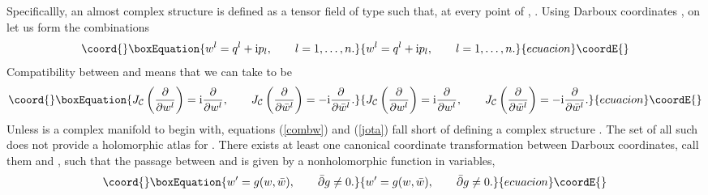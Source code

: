\documentclass[a4paper,a4paper]{article}
\begin{document}
Specificallly, an almost complex structure is defined  
as a tensor field \coordHE{} of type \coordHE{} such that, at every point of 
\coordHE{}, \coordHE{} \cite{KN}.  Using Darboux coordinates \coordHE{}, 
\coordHE{} on \coordHE{} let us form the combinations
\begin{equation}\coord{}\boxEquation{
w^l=q^l + {\rm i} p_l, \qquad l=1,\ldots, n.
\label{combw}
}{
w^l=q^l + {\rm i} p_l, \qquad l=1,\ldots, n.
}{ecuacion}\coordE{}\end{equation} 
Compatibility between \coordHE{} and \coordHE{} means that we can take \coordHE{} 
to be 
\begin{equation}\coord{}\boxEquation{
J_{\cal C}\left({\partial\over\partial w^l}\right)={\rm i}{\partial\over\partial w^l},
\qquad 
J_{\cal C}\left({\partial\over\partial \bar w^l}\right)=-{\rm i}{\partial\over\partial\bar w^l}.
\label{jota}
}{
J_{\cal C}\left({\partial\over\partial w^l}\right)={\rm i}{\partial\over\partial w^l},
\qquad 
J_{\cal C}\left({\partial\over\partial \bar w^l}\right)=-{\rm i}{\partial\over\partial\bar w^l}.
}{ecuacion}\coordE{}\end{equation}
Unless \coordHE{} is a complex  manifold to begin with, equations 
(\ref{combw}) and (\ref{jota}) fall short of defining a complex structure \coordHE{}. 
The set of all such \coordHE{} does not provide a holomorphic atlas for \coordHE{}. 
There exists at least one canonical coordinate transformation between 
Darboux coordinates, call them \coordHE{} and \coordHE{}, such that 
the passage between \coordHE{} and \coordHE{}
is given by a nonholomorphic function \coordHE{} in \coordHE{} variables,
\begin{equation}\coord{}\boxEquation{
w'=g(w,\bar w), \qquad \bar\partial g\neq 0.
\label{nonhol}
}{
w'=g(w,\bar w), \qquad \bar\partial g\neq 0.
}{ecuacion}\coordE{}\end{equation}
\end{document}

